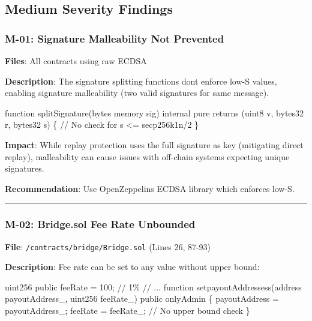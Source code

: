 \documentclass[
]{article}
\newenvironment{Shaded}{}{}
\newcommand{\NormalTok}[1]{#1}
\begin{document}
\subsection{Medium Severity Findings}\label{medium-severity-findings}

\subsubsection{M-01: Signature Malleability Not
Prevented}\label{m-01-signature-malleability-not-prevented}

\textbf{Files}: All contracts using raw ECDSA

\textbf{Description}: The signature splitting functions
don\textquotesingle t enforce low-S values, enabling signature
malleability (two valid signatures for same message).

\begin{Shaded}
\begin{Highlighting}[]
\NormalTok{function splitSignature(bytes memory sig) internal pure returns (uint8 v, bytes32 r, bytes32 s) \{}
\NormalTok{    // No check for s \textless{}= secp256k1n/2}
\NormalTok{\}}
\end{Highlighting}
\end{Shaded}

\textbf{Impact}: While replay protection uses the full signature as key
(mitigating direct replay), malleability can cause issues with off-chain
systems expecting unique signatures.

\textbf{Recommendation}: Use OpenZeppelin\textquotesingle s ECDSA
library which enforces low-S.

\begin{center}\rule{0.5\linewidth}{0.5pt}\end{center}

\subsubsection{M-02: Bridge.sol Fee Rate
Unbounded}\label{m-02-bridgesol-fee-rate-unbounded}

\textbf{File}: \texttt{/contracts/bridge/Bridge.sol} (Lines 26, 87-93)

\textbf{Description}: Fee rate can be set to any value without upper
bound:

\begin{Shaded}
\begin{Highlighting}[]
\NormalTok{uint256 public feeRate = 100; // 1\%}
\NormalTok{// ...}
\NormalTok{function setpayoutAddressess(address payoutAddress\_, uint256 feeRate\_) public onlyAdmin \{}
\NormalTok{    payoutAddress = payoutAddress\_;}
\NormalTok{    feeRate = feeRate\_;  // No upper bound check}
\NormalTok{\}}
\end{Highlighting}
\end{Shaded}
\end{document}
